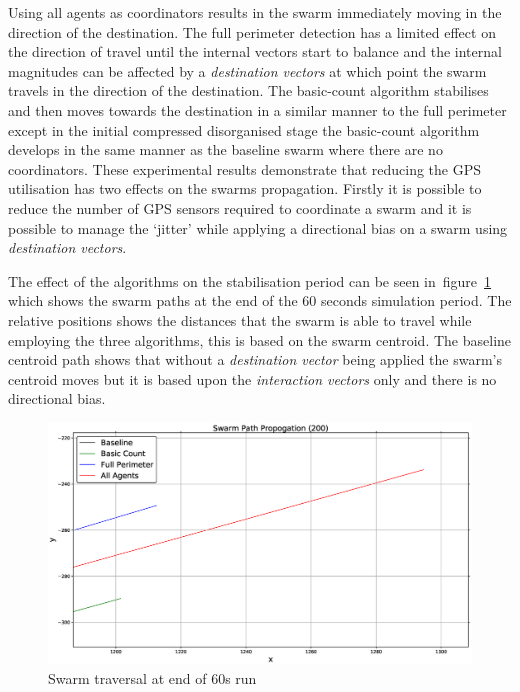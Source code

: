 Using all agents as coordinators results in the swarm immediately moving in the direction of the destination. The full perimeter detection has a limited effect on the direction of travel until the internal vectors start to balance and the internal magnitudes can be affected by a \textit{destination vectors} at which point the swarm travels in the direction of the destination. The basic-count algorithm stabilises and then moves towards the destination in a similar manner to the full perimeter except in the initial compressed disorganised stage the basic-count algorithm develops in the same manner as the baseline swarm where there are no coordinators. These experimental results demonstrate that reducing the GPS utilisation has two effects on the swarms propagation. Firstly it is possible to reduce the number of GPS sensors required to coordinate a swarm and it is possible to manage the `jitter' while applying a directional bias on a swarm using \textit{destination vectors}. 

The effect of the algorithms on the stabilisation period can be seen in~figure~\ref{reduced:SwarmPropagationPathComparison3} which shows the swarm paths at the end of the 60 seconds simulation period. The relative positions shows the distances that the swarm is able to travel while employing the three algorithms, this is based on the swarm centroid. The baseline centroid path shows that without a \textit{destination vector} being applied the swarm's centroid moves but it is based upon the \textit{interaction vectors} only and there is no directional bias.

\begin{figure}[H]
\begin{center}
\includegraphics[width=14cm]{CHAPTER-6/figures/SwarmPropagationComparison3}
\end{center}
\caption{Swarm traversal at end of 60s run\label{reduced:SwarmPropagationPathComparison3}}
\end{figure}


